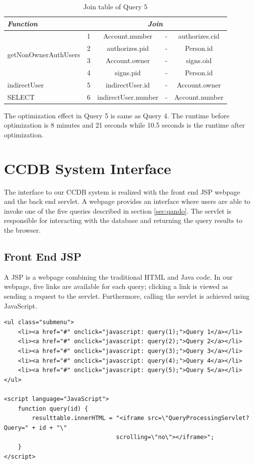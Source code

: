 \documentclass[11pt]{article}
\begin{document}
\begin{table}[!htbp]
\centering
\label{tab:q5}
\caption{Join table of Query 5}
\begin{tabular}{|l||r|c|l|c|}
\hline
{\itshape Function} & \multicolumn{4}{c|}{\itshape Join} \\
\hline
\multirow{4}{*}{getNonOwnerAuthUsers} & 1 & Account.number & - & authorizes.cid \\
\cline{2-5}
& 2 & authorizes.pid & - & Person.id \\
\cline{2-5}
& 3 & Account.owner & - & signs.oid \\
\cline{2-5}
& 4 & signs.pid & - & Person.id \\
\hline
indirectUser & 5 & indirectUser.id & - & Account.owner \\
\hline
SELECT & 6 & indirectUser.number & - & Account.number \\
\hline
\end{tabular}
\end{table}

\par
The optimization effect in Query 5 is same as Query 4. The runtime before optimization is 8 minutes and 21 seconds while 10.5 seconds is the runtime after optimization.

\section{CCDB System Interface}
The interface to our CCDB system is realized with the front end JSP webpage and the back end servlet. A webpage provides an interface where users are able to invoke one of the five queries described in section \ref{sec:qando}. The servlet is responsible for interacting with the database and returning the query results to the browser.
\subsection{Front End JSP}
A JSP is a webpage combining the traditional HTML and Java code. In our webpage, five links are available for each query; clicking a link is viewed as sending a request to the servlet. Furthermore, calling the servlet is achieved using JavaScript.
\begin{verbatim}
<ul class="submenu">
    <li><a href="#" onclick="javascript: query(1);">Query 1</a></li>
    <li><a href="#" onclick="javascript: query(2);">Query 2</a></li>
    <li><a href="#" onclick="javascript: query(3);">Query 3</a></li>
    <li><a href="#" onclick="javascript: query(4);">Query 4</a></li>
    <li><a href="#" onclick="javascript: query(5);">Query 5</a></li>
</ul>

<script language="JavaScript">
    function query(id) {
        resulttable.innerHTML = "<iframe src=\"QueryProcessingServlet?Query=" + id + "\"
                                scrolling=\"no\"></iframe>";
    }
</script>
\end{verbatim}
\end{document}
